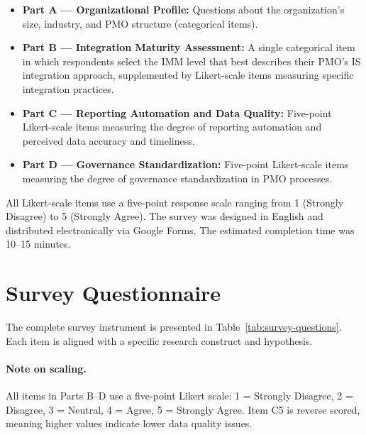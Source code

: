 \begin{itemize}
    \item \textbf{Part A --- Organizational Profile:} Questions about the
    organization's size, industry, and PMO structure (categorical items).
    \item \textbf{Part B --- Integration Maturity Assessment:} A single
    categorical item in which respondents select the IMM level that best
    describes their PMO's IS integration approach, supplemented by
    Likert-scale items measuring specific integration practices.
    \item \textbf{Part C --- Reporting Automation and Data Quality:}
    Five-point Likert-scale items measuring the degree of reporting
    automation and perceived data accuracy and timeliness.
    \item \textbf{Part D --- Governance Standardization:} Five-point
    Likert-scale items measuring the degree of governance standardization
    in PMO processes.
\end{itemize}

All Likert-scale items use a five-point response scale ranging from
1 (Strongly Disagree) to 5 (Strongly Agree). The survey was designed in
English and distributed electronically via Google Forms. The estimated
completion time was 10--15 minutes.

\section{Survey Questionnaire}
\label{sec:questionnaire}

The complete survey instrument is presented in
Table~\ref{tab:survey-questions}. Each item is aligned with a specific
research construct and hypothesis.

\paragraph{Note on scaling.}
All items in Parts B--D use a five-point Likert scale:
1 = Strongly Disagree, 2 = Disagree, 3 = Neutral,
4 = Agree, 5 = Strongly Agree. Item C5 is reverse scored,
meaning higher values indicate lower data quality issues.

